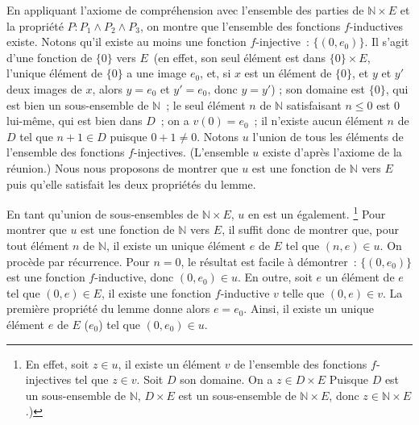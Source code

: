 En appliquant l'axiome de compréhension avec l'ensemble des parties de $\mathbb{N} \times E$ et la propriété $P: P_1 \wedge P_2 \wedge P_3$, on montre que l'ensemble des fonctions $f$-inductives existe. 
Notons qu'il existe au moins une fonction $f$-injective : $\lbrace (0, e_0) \rbrace$. 
Il s'agit d'une fonction de $\lbrace 0 \rbrace$ vers $E$ (en effet, son seul élément est dans $\lbrace 0 \rbrace \times E$, l'unique élément de $\lbrace 0 \rbrace$ a une image $e_0$, et, si $x$ est un élément de $\lbrace 0 \rbrace$, et $y$ et $y'$ deux images de $x$, alors $y = e_0$ et $y' = e_0$, donc $y = y'$) ; son domaine est $\lbrace 0 \rbrace$, qui est bien un sous-ensemble de $\mathbb{N}$ ; le seul élément $n$ de $\mathbb{N}$ satisfaisant $n \leq 0$ est $0$ lui-même, qui est bien dans $D$ ; on a $v(0) = e_0$ ; il n'existe aucun élément $n$ de $D$ tel que $n+1 \in D$ puisque $0+1 \neq 0$. 
Notons $u$ l'union de tous les éléments de l'ensemble des fonctions $f$-injectives. 
(L'ensemble $u$ existe d'après l'axiome de la réunion.) 
Nous nous proposons de montrer que $u$ est une fonction de $\mathbb{N}$ vers $E$ puis qu'elle satisfait les deux propriétés du lemme. 

En tant qu'union de sous-ensembles de $\mathbb{N} \times E$, $u$ en est un également.%
\footnote{
    En effet, soit $z \in u$, il existe un élément $v$ de l'ensemble des fonctions $f$-injectives tel que $z \in v$. 
    Soit $D$ son domaine. 
    On a $z \in D \times E$
    Puisque $D$ est un sous-ensemble de $\mathbb{N}$, $D \times E$ est un sous-ensemble de $\mathbb{N} \times E$, donc $z \in \mathbb{N} \times E$.)
}
Pour montrer que $u$ est une fonction de $\mathbb{N}$ vers $E$, il suffit donc de montrer que, pour tout élément $n$ de $\mathbb{N}$, il existe un unique élément $e$ de $E$ tel que $(n,e) \in u$. 
On procède par récurrence. 
Pour $n = 0$, le résultat est facile à démontrer : $\lbrace (0, e_0) \rbrace$ est une fonction $f$-inductive, donc $(0, e_0) \in u$. 
En outre, soit $e$ un élément de $e$ tel que $(0,e) \in E$, il existe une fonction $f$-inductive $v$ telle que $(0,e) \in v$. 
La première propriété du lemme donne alors $e = e_0$. 
Ainsi, il existe un unique élément $e$ de $E$ ($e_0$) tel que $(0, e_0) \in u$. 


